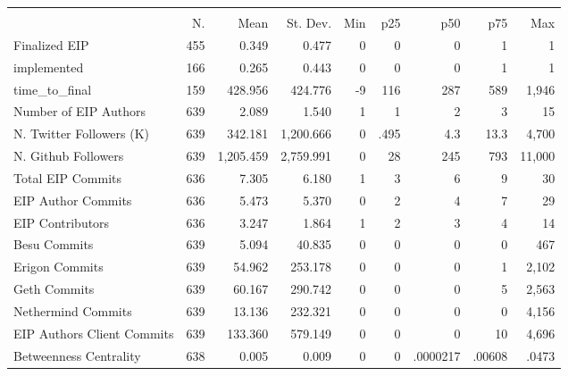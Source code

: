 {
\def\sym#1{\ifmmode^{#1}\else\(^{#1}\)\fi}
\begin{tabular}{l*{1}{rrrrrrrr}}
\hline\hline
                    &\multicolumn{8}{c}{}                                                                                   \\
                    &          N.&        Mean&    St. Dev.&         Min&         p25&         p50&         p75&         Max\\
\hline
Finalized EIP       &         455&       0.349&       0.477&           0&           0&           0&           1&           1\\
implemented         &         166&       0.265&       0.443&           0&           0&           0&           1&           1\\
time\_to\_final       &         159&     428.956&     424.776&          -9&         116&         287&         589&       1,946\\
Number of EIP Authors&         639&       2.089&       1.540&           1&           1&           2&           3&          15\\
N. Twitter Followers (K)&         639&     342.181&   1,200.666&           0&        .495&         4.3&        13.3&       4,700\\
N. Github Followers &         639&   1,205.459&   2,759.991&           0&          28&         245&         793&      11,000\\
Total EIP Commits   &         636&       7.305&       6.180&           1&           3&           6&           9&          30\\
EIP Author Commits  &         636&       5.473&       5.370&           0&           2&           4&           7&          29\\
EIP Contributors    &         636&       3.247&       1.864&           1&           2&           3&           4&          14\\
Besu Commits        &         639&       5.094&      40.835&           0&           0&           0&           0&         467\\
Erigon Commits      &         639&      54.962&     253.178&           0&           0&           0&           1&       2,102\\
Geth Commits        &         639&      60.167&     290.742&           0&           0&           0&           5&       2,563\\
Nethermind Commits  &         639&      13.136&     232.321&           0&           0&           0&           0&       4,156\\
EIP Authors Client Commits&         639&     133.360&     579.149&           0&           0&           0&          10&       4,696\\
Betweenness Centrality&         638&       0.005&       0.009&           0&           0&    .0000217&      .00608&       .0473\\
\hline\hline
\end{tabular}
}
